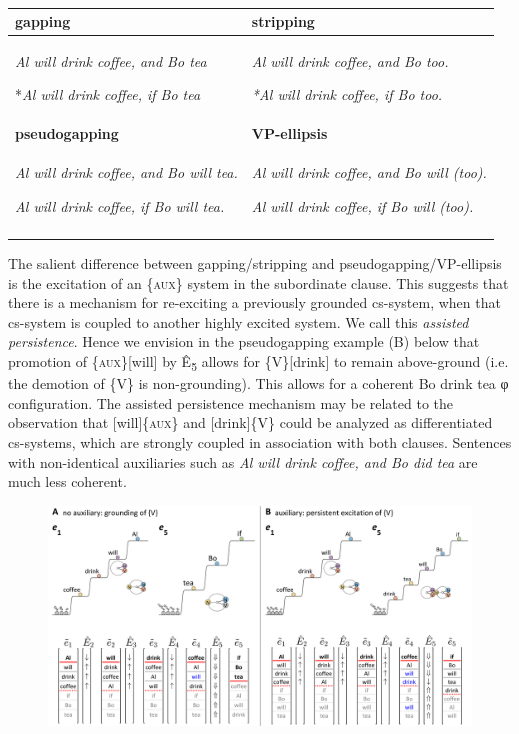 \begin{table}
\begin{tabularx}{\textwidth}{XX}
\lsptoprule
\textbf{gapping} & \textbf{stripping}\\
\midrule 

\textit{Al will drink coffee, and Bo tea}

*\textit{Al will drink coffee, if Bo tea} & \textit{Al will drink coffee, and Bo too.}

\textit{*Al will drink coffee, if Bo too.}  \\
\tablevspace

\textbf{pseudogapping} & \textbf{VP-ellipsis}\\
\midrule 
\textit{Al will drink coffee, and Bo will tea.}

\textit{Al will drink coffee, if Bo will tea.} & \textit{Al will drink coffee, and Bo will (too).}

\textit{Al will drink coffee, if Bo will (too).}\\
\lspbottomrule
\end{tabularx}
\caption{\missingcaption}\label{tab:key:}
\end{table}
  The salient difference between gapping/stripping and pseudogapping/VP-ellipsis is the excitation of an \{\textsc{aux}\} system in the subordinate clause. This suggests that there is a mechanism for re-exciting a previously grounded cs-system, when that cs-system is coupled to another highly excited system. We call this \textit{assisted persistence}. Hence we envision in the pseudogapping example (B) below that promotion of \{\textsc{aux}\}[will] by Ê\textsubscript{5} allows for \{V\}[drink] to remain above-ground (i.e. the demotion of \{V\} is non-grounding). This allows for a coherent {\textbar}Bo drink tea{\textbar} φ configuration. The assisted persistence mechanism may be related to the observation that [will]\{\textsc{aux}\} and [drink]\{V\} could be analyzed as differentiated cs-systems, which are strongly coupled in association with both clauses. Sentences with non-identical auxiliaries such as \textit{Al will drink coffee, and Bo did tea} are much less coherent.

  
\begin{figure}
\includegraphics[width=\textwidth]{figures/Tilsen-img147.png}
\caption{\missingcaption}
\label{fig:}
\end{figure}
 


